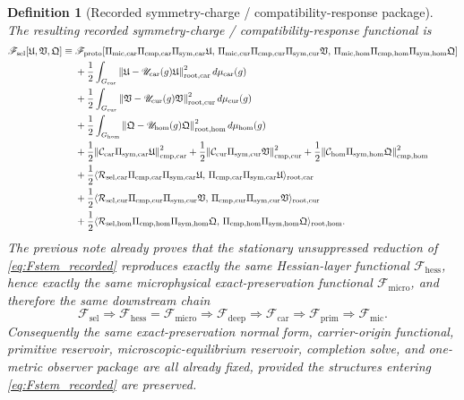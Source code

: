 \documentclass[11pt]{article}
\newcommand{\MicFunctional}{\mathscr F_{\mathrm{mic}}}
\newcommand{\PrimFunctional}{\mathscr F_{\mathrm{prim}}}
\newcommand{\CarrierFunctional}{\mathscr F_{\mathrm{car}}}
\newcommand{\DeepFunctional}{\mathscr F_{\mathrm{deep}}}
\newcommand{\ProtoFunctional}{\mathscr F_{\mathrm{proto}}}
\newcommand{\UltraFunctional}{\mathscr F_{\mathrm{micro}}}
\newcommand{\RootFunctional}{\mathscr F_{\mathrm{hess}}}
\newcommand{\StemFunctional}{\mathscr F_{\mathrm{sel}}}
\newcommand{\UltraCarProj}{\Pi_{\mathrm{mic,car}}}
\newcommand{\UltraCurProj}{\Pi_{\mathrm{mic,cur}}}
\newcommand{\UltraHomProj}{\Pi_{\mathrm{mic,hom}}}
\newcommand{\RootTensor}{\mathfrak U}
\newcommand{\RootRelabel}{\mathfrak V}
\newcommand{\RootFree}{\mathfrak Q}
\newcommand{\TensorSymProj}{\Pi_{\mathrm{sym,car}}}
\newcommand{\CurSymProj}{\Pi_{\mathrm{sym,cur}}}
\newcommand{\HomSymProj}{\Pi_{\mathrm{sym,hom}}}
\newcommand{\TensorCompat}{\mathcal C_{\mathrm{car}}}
\newcommand{\CurCompat}{\mathcal C_{\mathrm{cur}}}
\newcommand{\HomCompat}{\mathcal C_{\mathrm{hom}}}
\newcommand{\TensorCmpProj}{\Pi_{\mathrm{cmp,car}}}
\newcommand{\CurCmpProj}{\Pi_{\mathrm{cmp,cur}}}
\newcommand{\HomCmpProj}{\Pi_{\mathrm{cmp,hom}}}
\newcommand{\TensorSymGroup}{G_{\mathrm{car}}}
\newcommand{\CurSymGroup}{G_{\mathrm{cur}}}
\newcommand{\HomSymGroup}{G_{\mathrm{hom}}}
\newcommand{\TensorSymAct}{\mathscr U_{\mathrm{car}}}
\newcommand{\CurSymAct}{\mathscr U_{\mathrm{cur}}}
\newcommand{\HomSymAct}{\mathscr U_{\mathrm{hom}}}
\newcommand{\TensorResp}{\mathcal R_{\mathrm{sel,car}}}
\newcommand{\CurResp}{\mathcal R_{\mathrm{sel,cur}}}
\newcommand{\HomResp}{\mathcal R_{\mathrm{sel,hom}}}
\newtheorem{definition}{Definition}
\begin{document}
\begin{definition}[Recorded symmetry-charge / compatibility-response package]
The resulting recorded symmetry-charge / compatibility-response functional is
\begin{equation}
\begin{aligned}
\StemFunctional[\RootTensor,\RootRelabel,\RootFree]
\equiv\;
&\ProtoFunctional[
\UltraCarProj\TensorCmpProj\TensorSymProj\RootTensor,\,
\UltraCurProj\CurCmpProj\CurSymProj\RootRelabel,\,
\UltraHomProj\HomCmpProj\HomSymProj\RootFree]
\\
&+\frac12\int_{\TensorSymGroup}
\norm{\RootTensor-\TensorSymAct(g)\RootTensor}_{\mathrm{root,car}}^2\,
d\mu_{\mathrm{car}}(g)
\\
&+\frac12\int_{\CurSymGroup}
\norm{\RootRelabel-\CurSymAct(g)\RootRelabel}_{\mathrm{root,cur}}^2\,
d\mu_{\mathrm{cur}}(g)
\\
&+\frac12\int_{\HomSymGroup}
\norm{\RootFree-\HomSymAct(g)\RootFree}_{\mathrm{root,hom}}^2\,
d\mu_{\mathrm{hom}}(g)
\\
&+\frac12\norm{\TensorCompat\TensorSymProj\RootTensor}_{\mathrm{cmp,car}}^2
+\frac12\norm{\CurCompat\CurSymProj\RootRelabel}_{\mathrm{cmp,cur}}^2
+\frac12\norm{\HomCompat\HomSymProj\RootFree}_{\mathrm{cmp,hom}}^2
\\
&+\frac12\langle \TensorResp\TensorCmpProj\TensorSymProj\RootTensor,\,
\TensorCmpProj\TensorSymProj\RootTensor\rangle_{\mathrm{root,car}}
\\
&+\frac12\langle \CurResp\CurCmpProj\CurSymProj\RootRelabel,\,
\CurCmpProj\CurSymProj\RootRelabel\rangle_{\mathrm{root,cur}}
\\
&+\frac12\langle \HomResp\HomCmpProj\HomSymProj\RootFree,\,
\HomCmpProj\HomSymProj\RootFree\rangle_{\mathrm{root,hom}}.
\end{aligned}
\label{eq:Fstem_recorded}
\end{equation}
The previous note already proves that the stationary unsuppressed reduction of \eqref{eq:Fstem_recorded} reproduces exactly the same Hessian-layer functional \(\RootFunctional\), hence exactly the same microphysical exact-preservation functional \(\UltraFunctional\), and therefore the same downstream chain
\begin{equation}
\StemFunctional
\Longrightarrow
\RootFunctional=\UltraFunctional
\Longrightarrow
\DeepFunctional
\Longrightarrow
\CarrierFunctional
\Longrightarrow
\PrimFunctional
\Longrightarrow
\MicFunctional.
\label{eq:chain}
\end{equation}
Consequently the same exact-preservation normal form, carrier-origin functional, primitive reservoir, microscopic-equilibrium reservoir, completion solve, and one-metric observer package are all already fixed, provided the structures entering \eqref{eq:Fstem_recorded} are preserved.
\end{definition}
\end{document}
